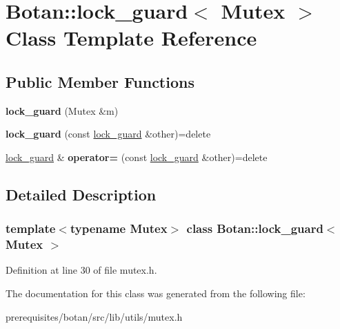\hypertarget{class_botan_1_1lock__guard}{}\section{Botan\+:\+:lock\+\_\+guard$<$ Mutex $>$ Class Template Reference}
\label{class_botan_1_1lock__guard}
\subsection*{Public Member Functions}
\begin{DoxyCompactItemize}
\item 
\mbox{\label{class_botan_1_1lock__guard_a0ac7297e28399f53bcec1192e31808a2}} 
{\bfseries lock\+\_\+guard} (Mutex \&m)
\item 
\mbox{\label{class_botan_1_1lock__guard_afc3d0353d360ffa3328de7030502d373}} 
{\bfseries lock\+\_\+guard} (const \mbox{\hyperlink{class_botan_1_1lock__guard}{lock\+\_\+guard}} \&other)=delete
\item 
\mbox{\label{class_botan_1_1lock__guard_a32a1e4aced30e938f8cd12d63c57a46a}} 
\mbox{\hyperlink{class_botan_1_1lock__guard}{lock\+\_\+guard}} \& {\bfseries operator=} (const \mbox{\hyperlink{class_botan_1_1lock__guard}{lock\+\_\+guard}} \&other)=delete
\end{DoxyCompactItemize}


\subsection{Detailed Description}
\subsubsection*{template$<$typename Mutex$>$\newline
class Botan\+::lock\+\_\+guard$<$ Mutex $>$}



Definition at line 30 of file mutex.\+h.



The documentation for this class was generated from the following file\+:\begin{DoxyCompactItemize}
\item 
prerequisites/botan/src/lib/utils/mutex.\+h\end{DoxyCompactItemize}
